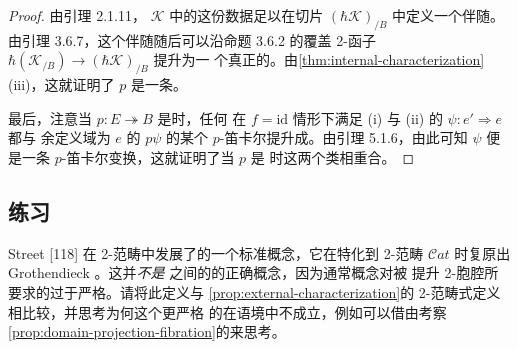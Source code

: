 \begin{proof}
由引理 2.1.11，\trInfinityCosmos{} $\mathcal{K}$ 中的这份数据足以在切片%
\trHomotopyTwoCategory{}
$(\hbar\mathcal{K})_{/B}$ 中定义一个伴随。由引理 3.6.7，这个伴随随后可以沿命题
3.6.2 的覆盖 2-函子 $\hbar(\mathcal{K}_{/B})\to(\hbar\mathcal{K})_{/B}$ 提升为一
个真正的\trFiberedAdjunction。由\cref{thm:internal-characterization}(iii)，这就证明了 $p$
是一条\trCartesianFibration。

最后，注意当 $p\colon E\twoheadrightarrow B$ 是\trCartesianFibration{}时，任何
在 $f=\mathrm{id}$ 情形下满足 (i) 与 (ii) 的 $\psi\colon e'\Rightarrow e$ 都与
余定义域为 $e$ 的 $p\psi$ 的某个 $p$-笛卡尔提升成\trFiberedIsomorphism。由引理
5.1.6，由此可知 $\psi$ 便是一条 $p$-笛卡尔变换，这就证明了当 $p$ 是%
\trCartesianFibration{}时这两个类相重合。
\end{proof}


\subsection*{练习}

\begin{exercise}\label{ex:street-cartesian-fibrations}
Street [118] 在 2-范畴中发展了\trCartesianFibration{}的一个标准概念，它在特化到
2-范畴 $\mathcal{C}at$ 时复原出 Grothendieck \trFibration。这并\emph{不是}%
\trInfinityCategory{}之间的\trCartesianFibration{}的正确概念，因为通常概念对被
提升 2-胞腔所要求的\trUniversalProperty{}过于严格。请将此定义与%
\cref{prop:external-characterization}的 2-范畴式定义相比较，并思考为何这个更严格
的\trUniversalProperty{}在\trInfinityCategory{}语境中不成立，例如可以借由考察%
\cref{prop:domain-projection-fibration}的\trCartesianFibration{}来思考。
\end{exercise}

